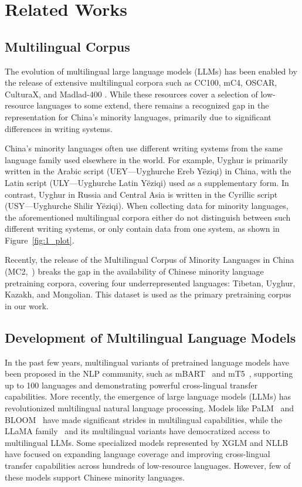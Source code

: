\section{Related Works}\label{sec:related-work}
\subsection{Multilingual Corpus}
The evolution of multilingual large language models (LLMs) has been enabled by the release of extensive multilingual corpora such as CC100, mC4, OSCAR, CulturaX, and Madlad-400 \cite{CC100,mc4,OSCAR,culturax,Madlad}. While these resources cover a selection of low-resource languages to some extend, there remains a recognized gap in the representation for China's minority languages, primarily due to significant differences in writing systems.
   
China’s minority languages often use different writing systems from the same language family used elsewhere in the world. For example, Uyghur is primarily written in the Arabic script (UEY—Uyghurche Ereb Yëziqi) in China, with the Latin script (ULY—Uyghurche Latin Yëziqi) used as a supplementary form. In contrast, Uyghur in Russia and Central Asia is written in the Cyrillic script (USY—Uyghurche Shilir Yëziqi). When collecting data for minority languages, the aforementioned multilingual corpora either do not distinguish between such different writing systems, or only contain data from one system, as shown in Figure~\ref{fig:1_plot}.
   
Recently, the release of the Multilingual Corpus of Minority Languages in China (MC2,~\citealp{mc2}) breaks the gap in the availability of Chinese minority language pretraining corpora, covering four underrepresented languages: Tibetan, Uyghur, Kazakh, and Mongolian. This dataset is used as the primary pretraining corpus in our work.

    
\subsection{Development of Multilingual Language Models}
In the past few years, multilingual variants of pretrained language models have been proposed in the NLP community, such as mBART~\citep{mbart} and mT5~\citep{mt5}, supporting up to 100 languages and demonstrating powerful cross-lingual transfer capabilities. More recently, the emergence of large language models (LLMs) has revolutionized multilingual natural language processing. Models like PaLM~\citep{palm} and BLOOM~\citep{bloom} have made significant strides in multilingual capabilities, while the LLaMA family~\citep{llama} and its multilingual variants have democratized access to multilingual LLMs. Some specialized models represented by XGLM and NLLB~\citep{xglm,nllb} have focused on expanding language coverage and improving cross-lingual transfer capabilities across hundreds of low-resource languages. However, few of these models support Chinese minority languages.

